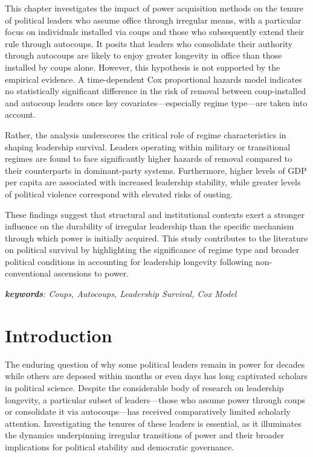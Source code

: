 \documentclass[
  12pt,
]{report}
\begin{document}
This chapter investigates the impact of power acquisition methods on the
tenure of political leaders who assume office through irregular means,
with a particular focus on individuals installed via coups and those who
subsequently extend their rule through autocoups. It posits that leaders
who consolidate their authority through autocoups are likely to enjoy
greater longevity in office than those installed by coups alone.
However, this hypothesis is not supported by the empirical evidence. A
time-dependent Cox proportional hazards model indicates no statistically
significant difference in the risk of removal between coup-installed and
autocoup leaders once key covariates---especially regime type---are
taken into account.

Rather, the analysis underscores the critical role of regime
characteristics in shaping leadership survival. Leaders operating within
military or transitional regimes are found to face significantly higher
hazards of removal compared to their counterparts in dominant-party
systems. Furthermore, higher levels of GDP per capita are associated
with increased leadership stability, while greater levels of political
violence correspond with elevated risks of ousting.

These findings suggest that structural and institutional contexts exert
a stronger influence on the durability of irregular leadership than the
specific mechanism through which power is initially acquired. This study
contributes to the literature on political survival by highlighting the
significance of regime type and broader political conditions in
accounting for leadership longevity following non-conventional
ascensions to power.

\emph{\textbf{keywords}: Coups, Autocoups, Leadership Survival, Cox
Model}

\newpage

\section{Introduction}\label{introduction-3}

The enduring question of why some political leaders remain in power for
decades while others are deposed within months or even days has long
captivated scholars in political science. Despite the considerable body
of research on leadership longevity, a particular subset of
leaders---those who assume power through coups or consolidate it via
autocoups---has received comparatively limited scholarly attention.
Investigating the tenures of these leaders is essential, as it
illuminates the dynamics underpinning irregular transitions of power and
their broader implications for political stability and democratic
governance.
\end{document}
